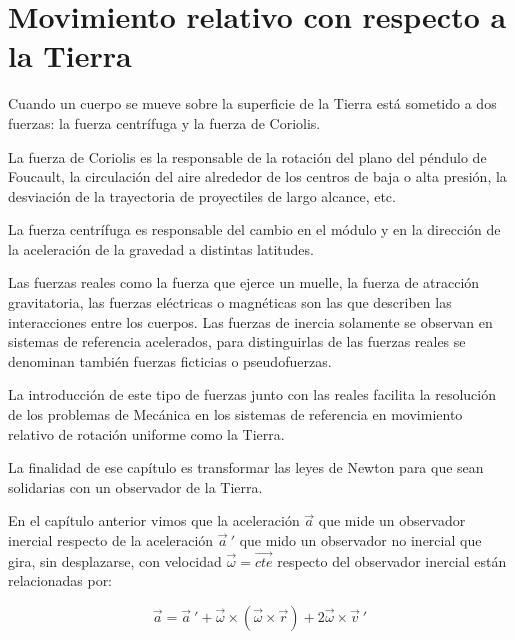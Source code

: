 \chapter{Movimiento relativo con respecto a la Tierra}
	


\begin{miparrafo}
\begin{small}
Cuando un cuerpo se mueve sobre la superficie de la Tierra está sometido a dos fuerzas: la fuerza centrífuga y la fuerza de Coriolis.

\vspace{2mm} La fuerza de Coriolis es la responsable de la rotación del plano del péndulo de Foucault, la circulación del aire alrededor de los centros de baja o alta presión, la desviación de la trayectoria de proyectiles de largo alcance, etc.

\vspace{2mm} La fuerza centrífuga es responsable del cambio en el módulo y en la dirección de la aceleración de la gravedad a distintas latitudes.

\vspace{2mm} Las fuerzas reales como la fuerza que ejerce un muelle, la fuerza de atracción gravitatoria, las fuerzas eléctricas o magnéticas son las que describen las interacciones entre los cuerpos. Las fuerzas de inercia solamente se observan en sistemas de referencia acelerados, para distinguirlas de las fuerzas reales se denominan también fuerzas ficticias o pseudofuerzas.

\vspace{2mm} La introducción de este tipo de fuerzas junto con las reales facilita la resolución de los problemas de Mecánica en los sistemas de referencia en movimiento relativo de rotación uniforme como la Tierra.
\end{small}
\end{miparrafo} 

La finalidad de ese capítulo es transformar las leyes de Newton para que sean solidarias con un observador de la Tierra.

En el capítulo anterior vimos que la aceleración $\vec a$ que mide un observador inercial respecto de la aceleración $\vec a\ '$ que mido un observador no inercial que gira, sin desplazarse, con velocidad $\vec \omega=\overrightarrow{cte}$ respecto del observador inercial están relacionadas por:



$$\vec a= \vec a \ ' + \vec \omega \times (\vec \omega \times \vec r)+2\vec \omega \times \vec v\ '$$


